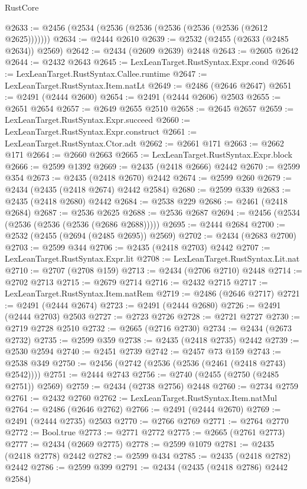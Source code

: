 \begin{lexlean}{RustCore}
\begin{coremodule}
@2633 := @2456 (@2534 (@2536 (@2536 (@2536 (@2536 (@2536 (@2612 @2625)))))))
@2634 := @2444 @2610
@2639 := @2532 (@2455 (@2633 (@2485 @2634)) @2569)
@2642 := @2434 (@2609 @2639) @2448
@2643 := @2605 @2642
@2644 := @2432 @2643
@2645 := LexLeanTarget.RustSyntax.Expr.cond
@2646 := LexLeanTarget.RustSyntax.Callee.runtime
@2647 := LexLeanTarget.RustSyntax.Item.natLt
@2649 := @2486 (@2646 @2647)
@2651 := @2491 (@2444 @2600)
@2654 := @2491 (@2444 @2606) @2503
@2655 := @2651 @2654
@2657 := @2649 @2655 @2510
@2658 := @2645 @2657
@2659 := LexLeanTarget.RustSyntax.Expr.succeed
@2660 := LexLeanTarget.RustSyntax.Expr.construct
@2661 := LexLeanTarget.RustSyntax.Ctor.adt
@2662 := @2661 @171
@2663 := @2662 @171
@2664 := @2660 @2663
@2665 := LexLeanTarget.RustSyntax.Expr.block
@2666 := @2599 @1392
@2669 := @2435 (@2418 @2666) @2442
@2670 := @2599 @354
@2673 := @2435 (@2418 @2670) @2442
@2674 := @2599 @260
@2679 := @2434 (@2435 (@2418 @2674) @2442 @2584)
@2680 := @2599 @339
@2683 := @2435 (@2418 @2680) @2442
@2684 := @2538 @229
@2686 := @2461 (@2418 @2684)
@2687 := @2536 @2625
@2688 := @2536 @2687
@2694 := @2456 (@2534 (@2536 (@2536 (@2536 (@2686 @2688)))))
@2695 := @2444 @2684
@2700 := @2532 (@2455 (@2694 (@2485 @2695)) @2569)
@2702 := @2434 (@2683 @2700)
@2703 := @2599 @344
@2706 := @2435 (@2418 @2703) @2442
@2707 := LexLeanTarget.RustSyntax.Expr.lit
@2708 := LexLeanTarget.RustSyntax.Lit.nat
@2710 := @2707 (@2708 @159)
@2713 := @2434 (@2706 @2710) @2448
@2714 := @2702 @2713
@2715 := @2679 @2714
@2716 := @2432 @2715
@2717 := LexLeanTarget.RustSyntax.Item.natRem
@2719 := @2486 (@2646 @2717)
@2721 := @2491 (@2444 @2674)
@2723 := @2491 (@2444 @2680)
@2726 := @2491 (@2444 @2703) @2503
@2727 := @2723 @2726
@2728 := @2721 @2727
@2730 := @2719 @2728 @2510
@2732 := @2665 (@2716 @2730)
@2734 := @2434 (@2673 @2732)
@2735 := @2599 @359
@2738 := @2435 (@2418 @2735) @2442
@2739 := @2530 @2594
@2740 := @2451 @2739
@2742 := @2457 @73 @159
@2743 := @2538 @349
@2750 := @2456 (@2742 (@2536 (@2536 (@2461 (@2418 @2743) @2542))))
@2751 := @2444 @2743
@2756 := @2740 (@2455 (@2750 (@2485 @2751)) @2569)
@2759 := @2434 (@2738 @2756) @2448
@2760 := @2734 @2759
@2761 := @2432 @2760
@2762 := LexLeanTarget.RustSyntax.Item.natMul
@2764 := @2486 (@2646 @2762)
@2766 := @2491 (@2444 @2670)
@2769 := @2491 (@2444 @2735) @2503
@2770 := @2766 @2769
@2771 := @2764 @2770
@2772 := Bool.true
@2773 := @2771 @2772
@2775 := @2665 (@2761 @2773)
@2777 := @2434 (@2669 @2775)
@2778 := @2599 @1079
@2781 := @2435 (@2418 @2778) @2442
@2782 := @2599 @434
@2785 := @2435 (@2418 @2782) @2442
@2786 := @2599 @399
@2791 := @2434 (@2435 (@2418 @2786) @2442 @2584)

\end{coremodule}
\end{lexlean}
